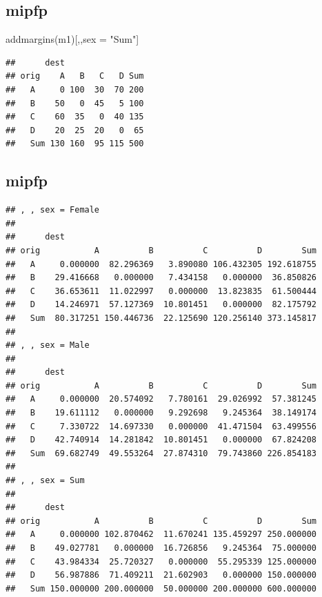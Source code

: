 \documentclass[
]{book}
\newenvironment{Shaded}{\begin{snugshade}}{\end{snugshade}}
\newcommand{\AttributeTok}[1]{\textcolor[rgb]{0.77,0.63,0.00}{#1}}
\newcommand{\DecValTok}[1]{\textcolor[rgb]{0.00,0.00,0.81}{#1}}
\newcommand{\FunctionTok}[1]{\textcolor[rgb]{0.00,0.00,0.00}{#1}}
\newcommand{\NormalTok}[1]{#1}
\newcommand{\OtherTok}[1]{\textcolor[rgb]{0.56,0.35,0.01}{#1}}
\newcommand{\SpecialCharTok}[1]{\textcolor[rgb]{0.00,0.00,0.00}{#1}}
\newcommand{\StringTok}[1]{\textcolor[rgb]{0.31,0.60,0.02}{#1}}
\begin{document}
\hypertarget{mipfp-6}{%
\subsection{mipfp}\label{mipfp-6}}

\begin{Shaded}
\begin{Highlighting}[]
\FunctionTok{addmargins}\NormalTok{(m1)[,,sex }\OtherTok{=} \StringTok{"Sum"}\NormalTok{]}
\end{Highlighting}
\end{Shaded}

\begin{verbatim}
##      dest
## orig    A   B   C   D Sum
##   A     0 100  30  70 200
##   B    50   0  45   5 100
##   C    60  35   0  40 135
##   D    20  25  20   0  65
##   Sum 130 160  95 115 500
\end{verbatim}

\hypertarget{mipfp-7}{%
\subsection{mipfp}\label{mipfp-7}}

\begin{Shaded}
\end{Shaded}

\begin{verbatim}
## , , sex = Female
## 
##      dest
## orig           A          B          C          D        Sum
##   A     0.000000  82.296369   3.890080 106.432305 192.618755
##   B    29.416668   0.000000   7.434158   0.000000  36.850826
##   C    36.653611  11.022997   0.000000  13.823835  61.500444
##   D    14.246971  57.127369  10.801451   0.000000  82.175792
##   Sum  80.317251 150.446736  22.125690 120.256140 373.145817
## 
## , , sex = Male
## 
##      dest
## orig           A          B          C          D        Sum
##   A     0.000000  20.574092   7.780161  29.026992  57.381245
##   B    19.611112   0.000000   9.292698   9.245364  38.149174
##   C     7.330722  14.697330   0.000000  41.471504  63.499556
##   D    42.740914  14.281842  10.801451   0.000000  67.824208
##   Sum  69.682749  49.553264  27.874310  79.743860 226.854183
## 
## , , sex = Sum
## 
##      dest
## orig           A          B          C          D        Sum
##   A     0.000000 102.870462  11.670241 135.459297 250.000000
##   B    49.027781   0.000000  16.726856   9.245364  75.000000
##   C    43.984334  25.720327   0.000000  55.295339 125.000000
##   D    56.987886  71.409211  21.602903   0.000000 150.000000
##   Sum 150.000000 200.000000  50.000000 200.000000 600.000000
\end{verbatim}
\end{document}
